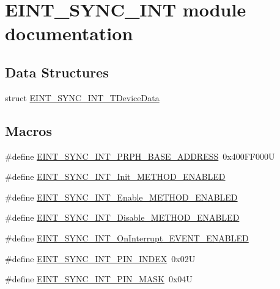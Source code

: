 \hypertarget{group___e_i_n_t___s_y_n_c___i_n_t__module}{\section{E\-I\-N\-T\-\_\-\-S\-Y\-N\-C\-\_\-\-I\-N\-T module documentation}
\label{group___e_i_n_t___s_y_n_c___i_n_t__module}
}
\subsection*{Data Structures}
\begin{DoxyCompactItemize}
\item 
struct \hyperlink{struct_e_i_n_t___s_y_n_c___i_n_t___t_device_data}{E\-I\-N\-T\-\_\-\-S\-Y\-N\-C\-\_\-\-I\-N\-T\-\_\-\-T\-Device\-Data}
\end{DoxyCompactItemize}
\subsection*{Macros}
\begin{DoxyCompactItemize}
\item 
\#define \hyperlink{group___e_i_n_t___s_y_n_c___i_n_t__module_gad52e9ba39f2863cee0ed738caa94cc83}{E\-I\-N\-T\-\_\-\-S\-Y\-N\-C\-\_\-\-I\-N\-T\-\_\-\-P\-R\-P\-H\-\_\-\-B\-A\-S\-E\-\_\-\-A\-D\-D\-R\-E\-S\-S}~0x400\-F\-F000\-U
\item 
\#define \hyperlink{group___e_i_n_t___s_y_n_c___i_n_t__module_gabce4727ed4efb48dc43276bd6a285b5a}{E\-I\-N\-T\-\_\-\-S\-Y\-N\-C\-\_\-\-I\-N\-T\-\_\-\-Init\-\_\-\-M\-E\-T\-H\-O\-D\-\_\-\-E\-N\-A\-B\-L\-E\-D}
\item 
\#define \hyperlink{group___e_i_n_t___s_y_n_c___i_n_t__module_ga3d1fe0785c1588a3a88f67fa67d184ba}{E\-I\-N\-T\-\_\-\-S\-Y\-N\-C\-\_\-\-I\-N\-T\-\_\-\-Enable\-\_\-\-M\-E\-T\-H\-O\-D\-\_\-\-E\-N\-A\-B\-L\-E\-D}
\item 
\#define \hyperlink{group___e_i_n_t___s_y_n_c___i_n_t__module_gabdc66245bce13f65b50f4075d4a31e48}{E\-I\-N\-T\-\_\-\-S\-Y\-N\-C\-\_\-\-I\-N\-T\-\_\-\-Disable\-\_\-\-M\-E\-T\-H\-O\-D\-\_\-\-E\-N\-A\-B\-L\-E\-D}
\item 
\#define \hyperlink{group___e_i_n_t___s_y_n_c___i_n_t__module_ga6978bc8c246f3ecea80104750e52210a}{E\-I\-N\-T\-\_\-\-S\-Y\-N\-C\-\_\-\-I\-N\-T\-\_\-\-On\-Interrupt\-\_\-\-E\-V\-E\-N\-T\-\_\-\-E\-N\-A\-B\-L\-E\-D}
\item 
\#define \hyperlink{group___e_i_n_t___s_y_n_c___i_n_t__module_gac5672018041a0839aebaf7c214f8e4b6}{E\-I\-N\-T\-\_\-\-S\-Y\-N\-C\-\_\-\-I\-N\-T\-\_\-\-P\-I\-N\-\_\-\-I\-N\-D\-E\-X}~0x02\-U
\item 
\#define \hyperlink{group___e_i_n_t___s_y_n_c___i_n_t__module_gaddd06b849c3d35837931a2be158c5b59}{E\-I\-N\-T\-\_\-\-S\-Y\-N\-C\-\_\-\-I\-N\-T\-\_\-\-P\-I\-N\-\_\-\-M\-A\-S\-K}~0x04\-U
\end{DoxyCompactItemize}
